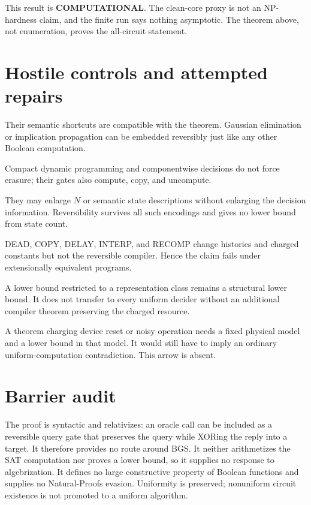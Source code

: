 \documentclass[11pt]{article}
\newcommand{\COMP}{\textbf{COMPUTATIONAL}}
\begin{document}
This result is \COMP.  The clean-core proxy is not an NP-hardness claim, and
the finite run says nothing asymptotic.  The theorem above, not enumeration,
proves the all-circuit statement.

\section{Hostile controls and attempted repairs}
\begin{description}[leftmargin=3.8cm,style=nextline]
\item[Horn, 2SAT, affine/Tseitin.] Their semantic shortcuts are compatible
with the theorem.  Gaussian elimination or implication propagation can be
embedded reversibly just like any other Boolean computation.
\item[Bounded treewidth and products.] Compact dynamic programming and
componentwise decisions do not force erasure; their gates also compute,
copy, and uncompute.
\item[Padding and redundant clauses.] They may enlarge $N$ or semantic state
descriptions without enlarging the decision information.  Reversibility
survives all such encodings and gives no lower bound from state count.
\item[Wrappers and alternate representations.] DEAD, COPY, DELAY, INTERP,
and RECOMP change histories and charged constants but not the reversible
compiler.  Hence the claim fails under extensionally equivalent programs.
\item[Compact circuits/branching programs.] A lower bound restricted to a
representation class remains a structural lower bound.  It does not transfer
to every uniform decider without an additional compiler theorem preserving
the charged resource.
\item[Physical dissipation.] A theorem charging device reset or noisy
operation needs a fixed physical model and a lower bound in that model.  It
would still have to imply an ordinary uniform-computation contradiction.
This arrow is absent.
\end{description}

\section{Barrier audit}
The proof is syntactic and relativizes: an oracle call can be included as a
reversible query gate that preserves the query while XORing the reply into a
target.  It therefore provides no route around BGS.  It neither arithmetizes
the SAT computation nor proves a lower bound, so it supplies no response to
algebrization.  It defines no large constructive property of Boolean
functions and supplies no Natural-Proofs evasion.  Uniformity is preserved;
nonuniform circuit existence is not promoted to a uniform algorithm.
\end{document}
